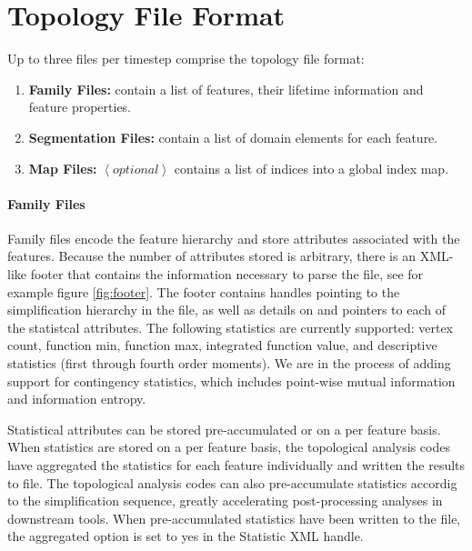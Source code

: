 \section{Topology File Format} \label{sec:topologyFileFormat} 
Up to three files per timestep comprise the topology file format:

\begin{enumerate}
\item {\bf Family Files:} contain a list of features, their lifetime information and feature properties.
\item {\bf Segmentation Files:} contain a list of domain elements for each feature.
\item {\bf Map Files:} $\left<optional\right>$ contains a list of indices into a global index map.  
\end{enumerate}

\paragraph{Family Files}
Family files encode the feature hierarchy and store attributes associated with the features.  
Because the number of attributes stored is arbitrary, there is an XML-like footer that contains 
the information necessary to parse the file, see for example figure \ref{fig:footer}.  The footer
contains handles pointing to the simplification hierarchy in the file, as well as details on
and pointers to each of the statistcal attributes.  The following statistics 
are currently supported: vertex count, function min, function max, integrated function value, and descriptive statistics 
(first through fourth order moments).  We are in the process of adding support for contingency statistics, which includes
point-wise mutual information and information entropy.  

Statistical attributes can be stored pre-accumulated or on a per feature basis.  
When statistics are stored on a per feature basis, the topological analysis codes have 
aggregated the statistics for each feature individually and written the results to file.  
The topological analysis codes can also pre-accumulate statistics accordig to the simplification 
sequence, greatly accelerating post-processing analyses in downstream tools.  When pre-accumulated 
statistics have been written to the file, the aggregated option is set to yes in 
the Statistic XML handle.  

